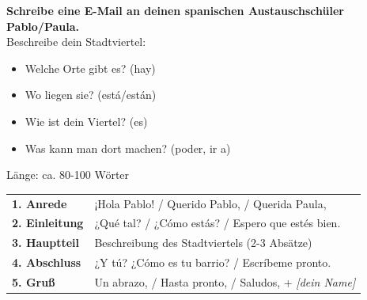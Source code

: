 \documentclass[11pt, a4paper]{article}
\begin{document}

\begin{center}
\end{center}

\vspace{0.3cm}


\begin{tcolorbox}[
    colback=hellgrau,
    colframe=spanisch,
    title={\color{white}\bfseries Aufgabe (Punto final, S. 33)},
    fonttitle=\bfseries
]
\textbf{Schreibe eine E-Mail an deinen spanischen Austauschschüler Pablo/Paula.}\\
Beschreibe dein Stadtviertel:
\begin{itemize}[leftmargin=2em]
    \item Welche Orte gibt es? (hay)
    \item Wo liegen sie? (está/están)
    \item Wie ist dein Viertel? (es)
    \item Was kann man dort machen? (poder, ir a)
\end{itemize}
Länge: ca. 80-100 Wörter
\end{tcolorbox}

\vspace{0.3cm}


\begin{tcolorbox}[
    colback=struktur!10,
    colframe=struktur,
    title={\color{white}\bfseries Struktur einer E-Mail},
    fonttitle=\bfseries
]

\begin{tabular}{@{}p{4cm}p{12.5cm}@{}}
\textbf{1. Anrede} & ¡Hola Pablo! / Querido Pablo, / Querida Paula, \\[0.3cm]
\textbf{2. Einleitung} & ¿Qué tal? / ¿Cómo estás? / Espero que estés bien. \\[0.3cm]
\textbf{3. Hauptteil} & Beschreibung des Stadtviertels (2-3 Absätze) \\[0.3cm]
\textbf{4. Abschluss} & ¿Y tú? ¿Cómo es tu barrio? / Escríbeme pronto. \\[0.3cm]
\textbf{5. Gruß} & Un abrazo, / Hasta pronto, / Saludos, + \textit{[dein Name]} \\
\end{tabular}

\end{tcolorbox}
\end{document}
